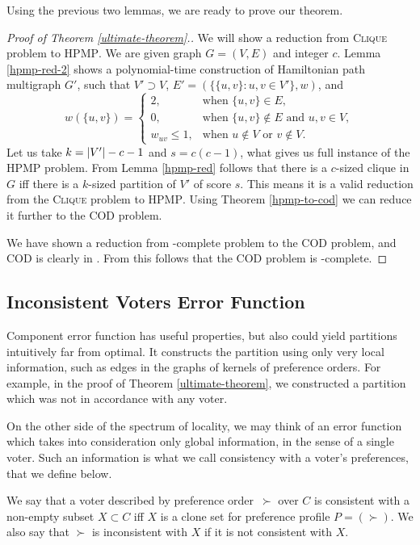 Using the previous two lemmas, we are ready to prove our theorem.

\begin{proof}[Proof of Theorem \ref{ultimate-theorem}.]
We will show a reduction from \textsc{Clique} problem to \textsc{HPMP}.
We are given graph $G = (V, E)$ and integer $c$.
Lemma \ref{hpmp-red-2} shows a polynomial-time construction of Hamiltonian path multigraph $G'$,
such that $V' \supset V$, $E'=(\{\{u,v\}: u,v \in V'\}, w)$, and
$$ w(\{u,v\}) =
\begin{cases}
2, 				&\text{when } \{u,v\} \in E ,\\
0, 				&\text{when } \{u,v\} \not\in E \text{ and } u,v \in V ,\\
w_{u v}\leq 1,	&\text{when } u \not\in V \text{ or } v \not\in V.
\end{cases}
$$
Let us take $k=\left\vert V' \right\vert-c-1$ and $s=c(c-1)$, what gives us full instance of the \textsc{HPMP} problem.
From Lemma \ref{hpmp-red} follows that there is a $c$-sized clique in $G$
iff there is a $k$-sized partition of $V'$ of score $s$.
This means it is a valid reduction from the \textsc{Clique} problem to \textsc{HPMP}.
Using Theorem \ref{hpmp-to-cod} we can reduce it further to the \textsc{COD} problem.

We have shown a reduction from \np-complete problem to the \textsc{COD} problem,
and \textsc{COD} is clearly in \np.
From this follows that the \textsc{COD} problem is \np-complete.
\end{proof}


\subsection{Inconsistent Voters Error Function}

Component error function has useful properties, but also could yield partitions
intuitively far from optimal.
It constructs the partition using only very local information,
such as edges in the graphs of kernels of preference orders.
For example, in the proof of Theorem \ref{ultimate-theorem}, we constructed a partition
which was not in accordance with any voter.

On the other side of the spectrum of locality, we may think of an error function which
takes into consideration only global information, in the sense of a single voter.
Such an information is what we call consistency with a voter's preferences, that we define below.

\begin{defn}
We say that a voter described by preference order~$\succ$ over $C$
is consistent with a non-empty subset $X \subset C$
iff $X$ is a clone set for preference profile $P = (\succ)$.
We also say that $\succ$ is inconsistent with $X$ if it is not consistent with $X$.
\end{defn}

